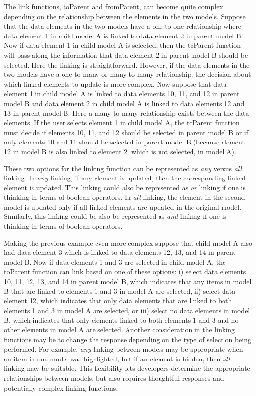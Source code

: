 \documentclass[11pt]{article}
\newcommand{\Rfunction}[1]{{\textsf{#1}}}
\begin{document}
The link functions, \Rfunction{toParent} and \Rfunction{fromParent}, can
become quite complex depending on the relationship between the elements in the
two models.  Suppose that the data elements in the two models have a
one-to-one relationship where data element 1 in child model A is linked to
data element 2 in parent model B.  Now if data element 1 in child model A is
selected, then the \Rfunction{toParent} function will pass along the
information that data element 2 in parent model B should be selected.  Here
the linking is straightforward.  However, if the data elements in the two
models have a one-to-many or many-to-many relationship, the decision about
which linked elements to update is more complex.  Now suppose that data
element 1 in child model A is linked to data elements 10, 11, and 12 in parent
model B and data element 2 in child model A is linked to data elements 12 and
13 in parent model B.  Here a many-to-many relationship exists between the
data elements.  If the user selects element 1 in child model A, the
\Rfunction{toParent} function must decide if elements 10, 11, and 12 should be
selected in parent model B or if only elements 10 and 11 should be selected in
parent model B (because element 12 in model B is also linked to element 2,
which is not selected, in model A).  

These two options for the linking function can be represented as \textit{any}
versus \textit{all} linking.  In \textit{any} linking, if any element is
updated, then the corresponding linked element is updated.  This linking could
also be represented as \textit{or} linking if one is thinking in terms of
boolean operators.  In \textit{all} linking, the element in the second model
is updated only if all linked elements are updated in the original model.
Similarly, this linking could be also be represented as \textit{and} linking
if one is thinking in terms of boolean operators.  

Making the previous example even more complex suppose that child model A also
had data element 3 which is linked to data elements 12, 13, and 14 in parent
model B.  Now if data elements 1 and 3 are selected in child model A, the
\Rfunction{toParent} function can link based on one of these options: i) select
data elements 10, 11, 12, 13, and 14 in parent model B, which indicates that
any items in model B that are linked to elements 1 and 3 in model A are
selected, ii) select data element 12, which indicates that only data elements
that are linked to both elements 1 and 3 in model A are selected, or iii)
select no data elements in model B, which indicates that only elements linked
to both elements 1 and 3 and no other elements in model A are selected.
Another consideration in the linking functions may be to change the response
depending on the type of selection being performed.  For example, \textit{any}
linking between models may be appropriate when an item in one model was
highlighted, but if an element is hidden, then \textit{all} linking may be
suitable.  This flexibility lets developers determine the appropriate
relationships between models, but also requires thoughtful responses and
potentially complex linking functions.
\end{document}
